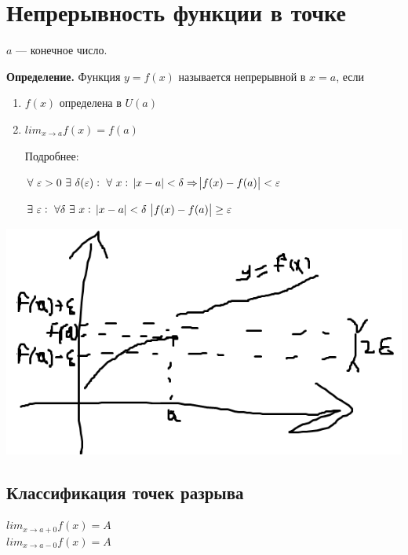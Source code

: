 \documentclass{article}
\begin{document}
    \section{Непрерывность функции в точке}

    \(a\) --- конечное число.

    \textbf{Определение.} Функция \(y = f(x)\) называется непрерывной в \(x = a\), если 

    \begin{enumerate}
        \item \(f(x)\) определена в \(U(a)\)
        \item \(lim_{x \rightarrow a} f(x) = f(a)\)
        
        Подробнее:

        \( \forall\ \varepsilon > 0\ \exists\ \delta(\varepsilon):\ \forall\ x:\ \abs{x - a} < \delta \Rightarrow \abs{f(x) - f(a)} < \varepsilon \)

        \(\exists\ \varepsilon:\ \forall \delta\ \exists\ x:\ \abs{x-a}<\delta\ \abs{f(x)-f(a)} \geq \varepsilon\)
    \end{enumerate}

    \begin{minipage}{0.49\linewidth}
        \includegraphics[width=\linewidth]{example_11_1_3_1.png}
    \end{minipage}

    \subsection{Классификация точек разрыва}
    \(lim_{x \rightarrow a + 0} f(x) = A\)\\
    \(lim_{x \rightarrow a - 0} f(x) = A\)
    
\end{document}
